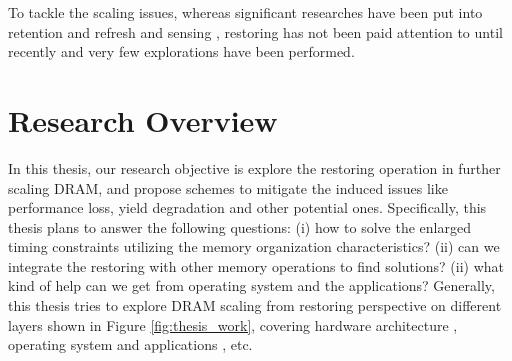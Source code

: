 To tackle the scaling issues, whereas significant researches have been put into retention and refresh \cite{ED98:ret_dist, ITC08:ret_dist, EDL09:ret, MICRO10:smart_refresh, MICRO10:elastic_refresh, ISCA12:raidr, ISCA13:ret, ISCA13:ddr4,ISCA13:archshield, HPCA13:refresh_pausing, HPCA14:mosaic, SIGMETRICS14:vrt, DSN15:vrt, ISCA15:reflex} and sensing \cite{ISCA13:charm, HPCA13:tldram, HPCA14:nuat, HPCA15:al-dram}, restoring has not been paid attention to until recently and very few explorations \cite{MEM14:twr, ISCA15:mcr} have been performed.




\section{Research Overview}
In this thesis, our research objective is explore the restoring operation in further scaling DRAM, and propose schemes to mitigate the induced issues like performance loss, yield degradation and other potential ones.
Specifically, this thesis plans to answer the following questions: 
(i) how to solve the enlarged timing constraints utilizing the memory organization characteristics? (ii) can we integrate the restoring with other memory operations to find solutions? (ii) what kind of help can we get from operating system and the applications?
Generally, this thesis tries to explore DRAM scaling from restoring perspective on different layers shown in Figure \ref{fig:thesis_work}, covering hardware architecture , operating system  and applications , etc.

